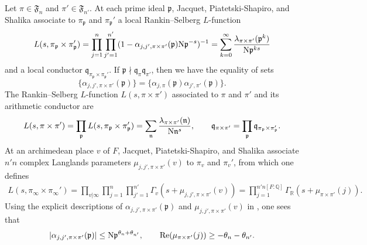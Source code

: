 \documentclass[11pt]{amsart}
\theoremstyle{remark}
\numberwithin{equation}{section}
\newcommand{\kp}{\mathfrak{p}}
\newcommand{\kn}{\mathfrak{n}}
\newcommand{\kq}{\mathfrak{q}}
\newcommand{\N}{\textnormal{N}}
\newcommand{\R}{\mathbb{R}}
\newcommand{\Q}{\mathbb{Q}}
\newcommand{\re}{\mathop{\mathrm{Re}}}
\begin{document}
Let $\pi\in\mathfrak{F}_n$ and $\pi'\in\mathfrak{F}_{n'}$.  At each prime ideal $\kp$, Jacquet, Piatetski-Shapiro, and Shalika \cite{JPSS} associate to $\pi_{\kp}$ and $\pi_{\kp}'$ a local Rankin--Selberg $L$-function
\begin{equation}
\label{eqn:RS_Dirichlet_series}
L(s,\pi_{\kp}\times\pi_{\kp}')=\prod_{j=1}^{n}\prod_{j'=1}^{n'}(1-\alpha_{j,j',\pi\times\pi'}(\kp) \N\kp^{-s})^{-1}=\sum_{k=0}^{\infty}\frac{\lambda_{\pi\times\pi'}(\kp^k)}{\N\kp^{ks}}
\end{equation}
and a local conductor $\kq_{\pi_{\kp}\times\pi_{\kp}'}$.  If $\kp\nmid \kq_{\pi}\kq_{\pi'}$, then we have the equality of sets
\begin{equation}
\label{eqn:separate_dirichlet_coeffs}
\{\alpha_{j,j',\pi\times\pi'}(\kp)\}=\{\alpha_{j,\pi}(\kp)\alpha_{j',\pi'}(\kp)\}.
\end{equation}
The Rankin--Selberg $L$-function $L(s,\pi\times\pi')$ associated to $\pi$ and $\pi'$ and its arithmetic conductor are
\[
L(s,\pi\times\pi')=\prod_{\kp}L(s,\pi_{\kp}\times\pi_{\kp}')=\sum_{\kn}\frac{\lambda_{\pi\times\pi'}(\kn)}{\N\kn^s},\qquad \kq_{\pi\times\pi'}=\prod_{\kp}\kq_{\pi_{\kp}\times\pi_{\kp}'}.
\]
At an archimedean place $v$ of $F$, Jacquet, Piatetski-Shapiro, and Shalika associate $n'n$ complex Langlands parameters $\mu_{j,j',\pi\times\pi'}(v)$ to $\pi_v$ and $\pi_v'$, from which one defines
\begin{align*}
L(s,\pi_{\infty}\times\pi_{\infty}') = \prod_{v|\infty}\prod_{j=1}^{n}\prod_{j'=1}^{n'}\Gamma_{v}(s+\mu_{j,j',\pi\times\pi'}(v))=\prod_{j=1}^{n'n[F:\Q]}\Gamma_{\R}(s+\mu_{\pi\times\pi'}(j)).
\end{align*}
Using the explicit descriptions of $\alpha_{j,j',\pi\times\pi'}(\kp)$ and $\mu_{j,j',\pi\times\pi'}(v)$ in \cite{humphries2019standard,soundararajan2019weak}, one sees that
\begin{equation}
\label{eqn:LRS_2}
|\alpha_{j,j',\pi\times\pi'}(\kp)|\leq\N\kp^{\theta_n + \theta_{n'}},\qquad \re(\mu_{\pi\times\pi'}(j))\geq -\theta_n - \theta_{n'}.
\end{equation}
\end{document}
